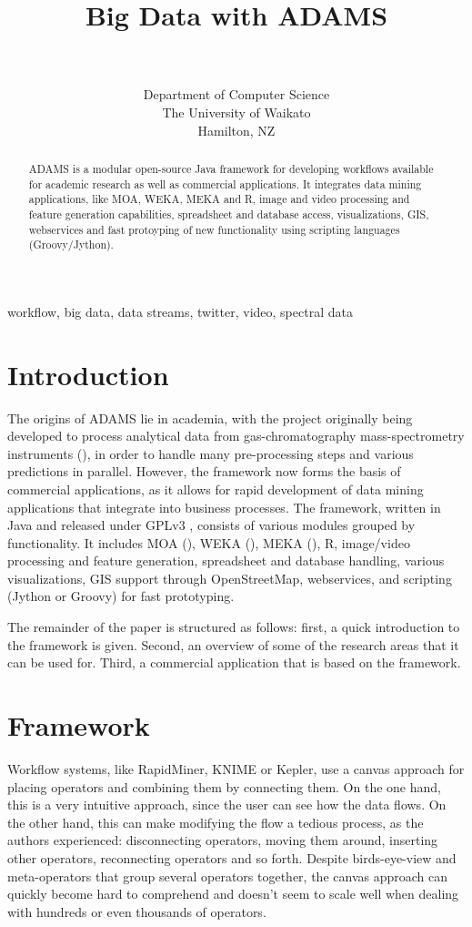 \documentclass[wcp]{jmlr}
\title[Big Data with ADAMS]{Big Data with ADAMS}
\author{\Name{Peter Reutemann} \Email{fracpete@waikato.ac.nz} \\
  \Name{Geoff Holmes} \Email{geoff@waikato.ac.nz}\\
  \addr Department of Computer Science \\
  The University of Waikato \\
  Hamilton, NZ
 }
\begin{document}
\maketitle

\begin{abstract}
ADAMS is a modular open-source Java framework for developing workflows available for
academic research as well as commercial applications. It integrates
data mining applications, like MOA, WEKA, MEKA and R, image and video
processing and feature generation capabilities, spreadsheet and database
access, visualizations, GIS, webservices and fast protoyping of new 
functionality using scripting languages (Groovy/Jython).
\end{abstract}
\begin{keywords}
workflow, big data, data streams, twitter, video, spectral data
\end{keywords}

\section{Introduction}
The origins of ADAMS lie in academia, with the project originally being developed to process analytical data from gas-chromatography mass-spectrometry instruments (\cite{gcms}), in order to handle many pre-processing steps and various predictions in parallel. However, the framework now forms the basis of commercial applications, as it allows for rapid development of data mining applications that integrate into business processes. The framework, written in Java and released under GPLv3
, consists of various modules grouped by functionality. It includes MOA (\cite{moa}), WEKA (\cite{weka}), MEKA (\cite{meka}), R, image/video processing and feature generation, spreadsheet and database handling, various visualizations, GIS support through OpenStreetMap, webservices, and scripting (Jython or Groovy) for fast prototyping.

The remainder of the paper is structured as follows: first, a quick introduction to the framework is given. Second, an overview of some of the research areas that it can be used for. Third, a commercial application that is based on the framework.

\section{Framework}
Workflow systems, like RapidMiner, KNIME or Kepler, use a canvas approach for placing operators and combining them by connecting them. On the one hand, this is a very intuitive approach, since the user can see how the data flows. On the other hand, this can make modifying the flow a tedious process, as the authors experienced: disconnecting operators, moving them around, inserting other operators, reconnecting operators and so forth. Despite birds-eye-view and meta-operators that group several operators together, the canvas approach can quickly become hard to comprehend and doesn't seem to scale well when dealing with hundreds or even thousands of operators.
\end{document}
